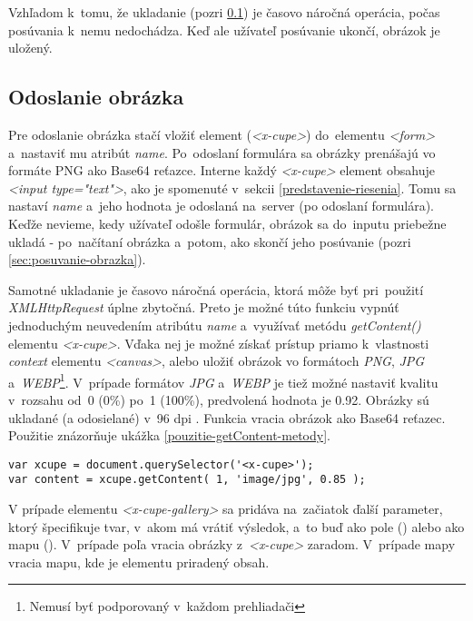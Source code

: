 Vzhľadom k~tomu, že ukladanie (pozri \ref{sec:odoslanie-obrazka}) je časovo náročná operácia, počas posúvania k~nemu nedochádza. Keď ale užívateľ posúvanie ukončí, obrázok je uložený.

\subsection{Odoslanie obrázka}
\label{sec:odoslanie-obrazka}

Pre odoslanie obrázka stačí vložiť element (\emph{<x-cupe>}) do~elementu \emph{<form>} a~nastaviť mu atribút \emph{name}. Po~odoslaní formulára sa obrázky prenášajú vo formáte PNG ako Base64 reťazce. Interne každý \emph{<x-cupe>} element obsahuje \emph{<input type="text"\textgreater}, ako je spomenuté v~sekcii \ref{predstavenie-riesenia}. Tomu sa nastaví \emph{name} a~jeho hodnota je odoslaná na~server (po odoslaní formulára). Keďže nevieme, kedy užívateľ odošle formulár, obrázok sa do~inputu priebežne ukladá - po~načítaní obrázka a~potom, ako skončí jeho posúvanie (pozri \ref{sec:posuvanie-obrazka}).

Samotné ukladanie je časovo náročná operácia, ktorá môže byť pri~použití \emph{XMLHttpRequest} úplne zbytočná. Preto je možné túto funkciu vypnúť jednoduchým neuvedením atribútu \emph{name} a~využívať metódu \emph{getContent()} elementu \emph{<x-cupe>}. Vďaka nej je možné získať prístup priamo k~vlastnosti \emph{context} elementu \emph{<canvas>}, alebo uložiť obrázok vo formátoch \emph{PNG}, \emph{JPG} a~\emph{WEBP}\footnote{Nemusí byť podporovaný v~každom prehliadači}. V~prípade formátov \emph{JPG} a~\emph{WEBP} je tiež možné nastaviť kvalitu v~rozsahu od~0 (0\%) po~1 (100\%), predvolená hodnota je 0.92. Obrázky sú ukladané (a odosielané) v~96 dpi \cite{Canvas_toURL}. Funkcia vracia obrázok ako Base64 reťazec. Použitie znázorňuje ukážka \ref{pouzitie-getContent-metody}.

\begin{lstlisting}[label=pouzitie-getContent-metody,caption=Použitie metódy getContent() pre~získanie obrázka.]
var xcupe = document.querySelector('<x-cupe>');
var content = xcupe.getContent( 1, 'image/jpg', 0.85 );
\end{lstlisting}

V prípade elementu \emph{<x-cupe-gallery>} sa pridáva na~začiatok ďalší parameter, ktorý špecifikuje tvar, v~akom má vrátiť výsledok, a~to buď ako pole () alebo ako mapu (). V~prípade poľa vracia obrázky z~\emph{<x-cupe>} zaradom. V~prípade mapy vracia mapu, kde je elementu priradený obsah.

